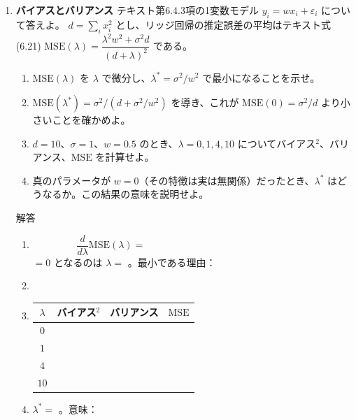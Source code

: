 \documentclass[a4paper,dvipdfmx]{jsarticle}
\newcommand{\提出期限}{2026年11月2日（月）}
\newcommand{\学籍番号}{0000000}
\newcommand{\氏名}{氏名を書く}
\newcommand{\提出日}{2026年11月2日}
\newenvironment{answer}{\begin{itembox}[l]{解答}}{\end{itembox}}
\begin{document}
\begin{enumerate}
  \item \textbf{バイアスとバリアンス}\quad
    テキスト第6.4.3項の1変数モデル $y_i = w x_i + \varepsilon_i$ について答えよ。
    $d = \sum_i x_i^2$ とし、リッジ回帰の推定誤差の平均はテキスト式(6.21)
    $\mathrm{MSE}(\lambda) = \dfrac{\lambda^2 w^2 + \sigma^2 d}{(d + \lambda)^2}$ である。
    \begin{enumerate}
      \item $\mathrm{MSE}(\lambda)$ を $\lambda$ で微分し、$\lambda^* = \sigma^2/w^2$ で最小になることを示せ。
      \item $\mathrm{MSE}(\lambda^*) = \sigma^2/(d + \sigma^2/w^2)$ を導き、これが $\mathrm{MSE}(0) = \sigma^2/d$ より小さいことを確かめよ。
      \item $d = 10$、$\sigma = 1$、$w = 0.5$ のとき、$\lambda = 0, 1, 4, 10$ についてバイアス$^2$、バリアンス、$\mathrm{MSE}$ を計算せよ。
      \item 真のパラメータが $w = 0$（その特徴は実は無関係）だったとき、$\lambda^*$ はどうなるか。この結果の意味を説明せよ。
    \end{enumerate}
    \begin{answer}
      \begin{enumerate}
        \item
          \begin{equation*}
            \frac{d}{d\lambda}\mathrm{MSE}(\lambda) = \phantom{XXXXXXXXXXXXXXXXXXXX}
          \end{equation*}
          $= 0$ となるのは $\lambda = $ \phantom{XXXXXX}。最小である理由：
          \vspace{8mm}
        \item
          \vspace{14mm}
        \item
          \begin{center}
            \begin{tabular}{c|c|c|c}
              $\lambda$ & バイアス$^2$ & バリアンス & $\mathrm{MSE}$ \\ \hline
              $0$ & \phantom{XXXXXX} & \phantom{XXXXXX} & \phantom{XXXXXX} \\
              $1$ & \phantom{XXXXXX} & \phantom{XXXXXX} & \phantom{XXXXXX} \\
              $4$ & \phantom{XXXXXX} & \phantom{XXXXXX} & \phantom{XXXXXX} \\
              $10$ & \phantom{XXXXXX} & \phantom{XXXXXX} & \phantom{XXXXXX}
            \end{tabular}
          \end{center}
        \item $\lambda^* = $ \phantom{XXXXXX}。意味：
          \vspace{10mm}
      \end{enumerate}
    \end{answer}


\end{enumerate}
\end{document}
